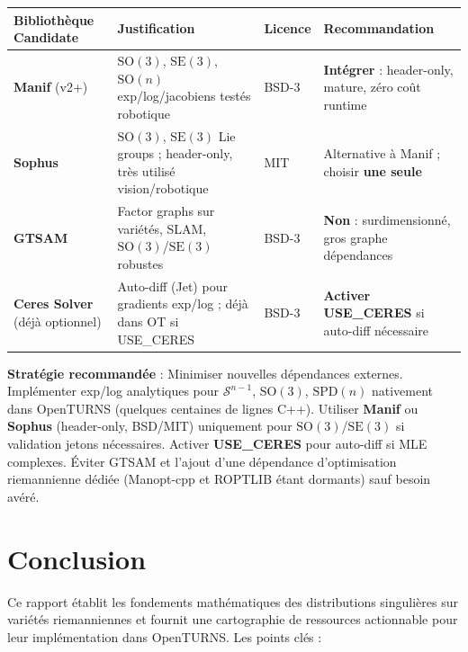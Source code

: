 \documentclass[11pt,a4paper]{article}
\begin{document}
\begin{longtable}{@{}p{3cm}p{4.5cm}p{3.5cm}p{4cm}@{}}
\toprule
\textbf{Bibliothèque Candidate} & \textbf{Justification} & \textbf{Licence} & \textbf{Recommandation} \\
\midrule
\textbf{Manif} (v2+) & $\text{SO}(3)$, $\text{SE}(3)$, $\text{SO}(n)$ exp/log/jacobiens testés robotique & BSD-3 & \textbf{Intégrer} : header-only, mature, zéro coût runtime \\
\textbf{Sophus} & $\text{SO}(3)$, $\text{SE}(3)$ Lie groups ; header-only, très utilisé vision/robotique & MIT & Alternative à Manif ; choisir \textbf{une seule} \\
\textbf{GTSAM} & Factor graphs sur variétés, SLAM, $\text{SO}(3)$/$\text{SE}(3)$ robustes & BSD-3 & \textbf{Non} : surdimensionné, gros graphe dépendances \\
\textbf{Ceres Solver} (déjà optionnel) & Auto-diff (Jet) pour gradients exp/log ; déjà dans OT si USE\_CERES & BSD-3 & \textbf{Activer USE\_CERES} si auto-diff nécessaire \\
\bottomrule
\end{longtable}

\medskip
\noindent\textbf{Stratégie recommandée} : Minimiser nouvelles dépendances externes. Implémenter exp/log analytiques pour $\mathcal{S}^{n-1}$, $\text{SO}(3)$, $\text{SPD}(n)$ nativement dans OpenTURNS (quelques centaines de lignes C++). Utiliser \textbf{Manif} ou \textbf{Sophus} (header-only, BSD/MIT) uniquement pour $\text{SO}(3)$/$\text{SE}(3)$ si validation jetons nécessaires. Activer \textbf{USE\_CERES} pour auto-diff si MLE complexes. Éviter GTSAM et l'ajout d'une dépendance d'optimisation riemannienne dédiée (Manopt-cpp et ROPTLIB étant dormants) sauf besoin avéré.

\section{Conclusion}

Ce rapport établit les fondements mathématiques des distributions singulières sur variétés riemanniennes et fournit une cartographie de ressources actionnable pour leur implémentation dans OpenTURNS. Les points clés :
\end{document}
